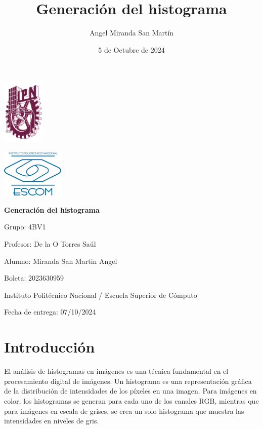 \documentclass{report}
\title{Generación del histograma}
\author{Angel Miranda San Martín}
\date{5 de Octubre de 2024}
\begin{document}
  \begin{titlepage}
    \begin{minipage}{0.5\textwidth}
      \flushleft
      \includegraphics[width=2cm]{image/logo-ipn-guinda}
    \end{minipage}
    \begin{minipage}{0.5\textwidth}
      \flushright
      \includegraphics[width=3cm]{image/logo-escom}
    \end{minipage}
    \vspace{1cm}
    \begin{center}
      \Huge \textbf{Generación del histograma}
      \vspace{1cm}

      \Large Grupo: 4BV1
      \vspace{1cm}

      Profesor: De la O Torres Saúl
      \vspace{1cm}

      Alumno: Miranda San Martin Angel
      \vspace{0.5cm}

      Boleta: 2023630959
      \vspace{2cm}

      \large Instituto Politécnico Nacional / Escuela Superior de Cómputo
      \vspace{1cm}

      \large Fecha de entrega: 07/10/2024
    \end{center}
  \end{titlepage}

  \tableofcontents


  \chapter{Introducción}\label{ch:introduccion}
  El análisis de histogramas en imágenes es una técnica fundamental en el procesamiento digital de imágenes.
  Un histograma es una representación gráfica de la distribución de intensidades de los píxeles en una imagen.
  Para imágenes en color, los histogramas se generan para cada uno de los canales RGB, mientras que para imágenes en escala de grises, se crea un solo histograma que muestra las intensidades en niveles de gris.
\end{document}

